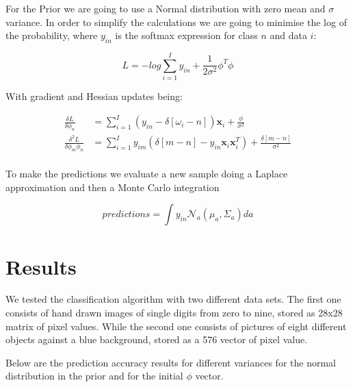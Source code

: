 \documentclass[12pt]{article}
\begin{document}
For the Prior we are going to use a Normal distribution with zero mean and $\sigma$ variance.
In order to simplify the calculations we are going to minimise the log of the probability, where $y_{in}$ is the softmax expression for class $n$ and data $i$:

\begin{equation}
\label{L}
L = - log \sum_{i = 1}^{I} y_{in} + \frac{1}{2 \sigma^{2}} \phi^{T} \phi 
\end{equation}

With gradient and Hessian updates being:

\begin{align}
\label{Grad-Hess-Update}
\frac{\delta L}{ \delta \phi_{n}} &= \sum_{i = 1}^{I} \left( y_{in} - \delta \left[ \omega_{i} - n \right] \right) \mathbf{x}_{i}  + \frac{\phi} {\sigma^{2}} \nonumber \\
\frac{\delta^{2} L}{ \delta \phi_{m}\phi_{n}} &= \sum_{i = 1}^{I} y_{im} \left( \delta \left[ m - n \right] - y_{in} \mathbf{x}_{i} \mathbf{x}_{i}^{T}  \right) +  \frac{\delta \left[ m - n \right]}{\sigma^{2}} \nonumber \\
\end{align}

To make the predictions we evaluate a new sample doing a Laplace approximation and then a Monte Carlo integration

\begin{equation}
\label{Predictions}
predictions = \int y_{in} \mathcal{N}_{a} \left( \mu_{a}, \Sigma_{a} \right) da
\end{equation}
 
\section{Results}

We tested the classification algorithm with two different data sets.
The first one consists of hand drawn images of single digits from zero to nine,
stored as 28x28 matrix of pixel values.
While the second one consists of pictures of eight different objects against a blue background, stored as a 576 vector of pixel value.

Below are the prediction accuracy results for different variances for the normal distribution in the prior and for the initial $\phi$ vector. 
\end{document}
